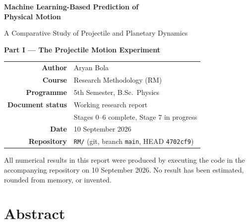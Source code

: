\documentclass[11pt,a4paper]{article}
\begin{document}

\begin{titlepage}
\centering
\vspace*{2cm}

{\LARGE\bfseries Machine Learning-Based Prediction of\\[0.3em]
Physical Motion\par}

\vspace{0.8cm}
{\Large A Comparative Study of Projectile and Planetary Dynamics\par}

\vspace{1.5cm}
{\large\bfseries Part I --- The Projectile Motion Experiment\par}

\vspace{2.5cm}

\begin{tabular}{rl}
\textbf{Author}          & Aryan Bola \\[0.35em]
\textbf{Course}          & Research Methodology (RM) \\[0.35em]
\textbf{Programme}       & 5th Semester, B.Sc.\ Physics \\[0.35em]
\textbf{Document status} & Working research report \\
                         & Stages 0--6 complete, Stage 7 in progress \\[0.35em]
\textbf{Date}            & 10 September 2026 \\[0.35em]
\textbf{Repository}      & \texttt{RM/} (git, branch \texttt{main}, HEAD \texttt{4702cf9}) \\
\end{tabular}

\vfill

{\small All numerical results in this report were produced by executing the code in the
accompanying repository on 10 September 2026. No result has been estimated, rounded from
memory, or invented.\par}

\vspace{1cm}
\end{titlepage}

\section*{Abstract}
\end{document}
